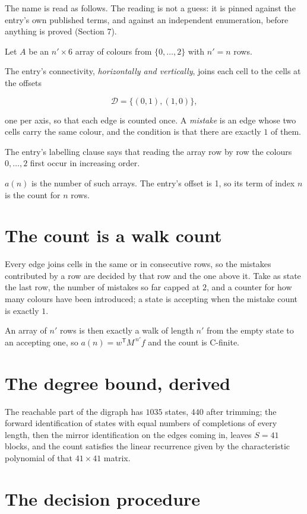 \documentclass[11pt]{article}
\theoremstyle{definition}
\begin{document}
The name is read as follows. The reading is not a guess: it is pinned against the entry's own published terms, and against an independent enumeration, before anything is proved (Section 7).

Let $A$ be an $n' \times 6$ array of colours from $\{0,\dots,2\}$ with $n' = n$ rows.

The entry's connectivity, {\itshape horizontally and vertically}, joins each cell to the cells at the offsets

\[\mathcal{D} = \{(0,1), (1,0)\},\]

one per axis, so that each edge is counted once. A {\itshape mistake} is an edge whose two cells carry the same colour, and the condition is that there are exactly $1$ of them.

The entry's labelling clause says that reading the array row by row the colours $0,\dots,2$ first occur in increasing order.

$a(n)$ is the number of such arrays. The entry's offset is 1, so its term of index $n$ is the count for $n$ rows.

\section{The count is a walk count}

Every edge joins cells in the same or in consecutive rows, so the mistakes contributed by a row are decided by that row and the one above it. Take as state the last row, the number of mistakes so far capped at $2$, and a counter for how many colours have been introduced; a state is accepting when the mistake count is exactly $1$.

An array of $n'$ rows is then exactly a walk of length $n'$ from the empty state to an accepting one, so $a(n) = w^{\mathsf T}M^{\,n'}f$ and the count is C-finite.

\section{The degree bound, derived}

The reachable part of the digraph has $1035$ states, $440$ after trimming; the forward identification of states with equal numbers of completions of every length, then the mirror identification on the edges coming in, leaves $S = 41$ blocks, and the count satisfies the linear recurrence given by the characteristic polynomial of that $41\times41$ matrix.

\section{The decision procedure}
\end{document}
